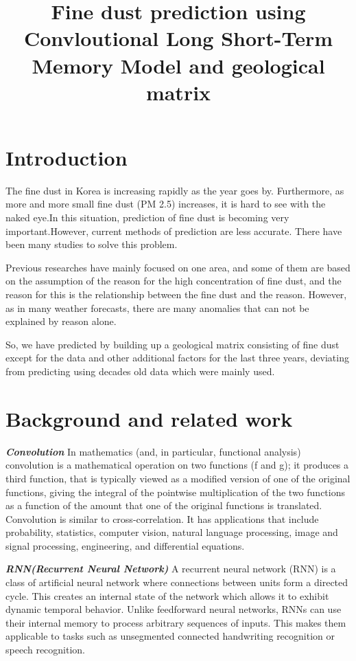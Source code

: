 \documentclass{kcc}
\title{Fine dust prediction using Convloutional Long Short-Term\\ Memory Model and geological matrix}
\author{
}
\begin{document}
\maketitle

\section{Introduction}

The fine dust in Korea is increasing rapidly as the year goes by.
Furthermore, as more and more small fine dust (PM 2.5) increases, it is hard to see with the naked eye.In this situation, prediction of fine dust is becoming very important.However, current methods of prediction are less accurate.
There have been many studies to solve this problem.

Previous researches have mainly focused on one area, and some of them are based on the assumption of the reason for the high concentration of fine dust, and the reason for this is the relationship between the fine dust and the reason.
However, as in many weather forecasts, there are many anomalies that can not be explained by reason alone.

So, we have predicted by building up a geological matrix consisting of fine dust except for the data and other additional factors for the last three years, deviating from predicting using decades old data which were mainly used.



\section{Background and related work}

\textbf{\textit{Convolution}} In mathematics (and, in particular, functional analysis) convolution is a mathematical operation on two functions (f and g); it produces a third function, that is typically viewed as a modified version of one of the original functions, giving the integral of the pointwise multiplication of the two functions as a function of the amount that one of the original functions is translated. Convolution is similar to cross-correlation. It has applications that include probability, statistics, computer vision, natural language processing, image and signal processing, engineering, and differential equations.

\textbf{\textit{RNN(Recurrent Neural Network)}} A recurrent neural network (RNN) is a class of artificial neural network where connections between units form a directed cycle. This creates an internal state of the network which allows it to exhibit dynamic temporal behavior. Unlike feedforward neural networks, RNNs can use their internal memory to process arbitrary sequences of inputs. This makes them applicable to tasks such as unsegmented connected handwriting recognition or speech recognition.
\end{document}
